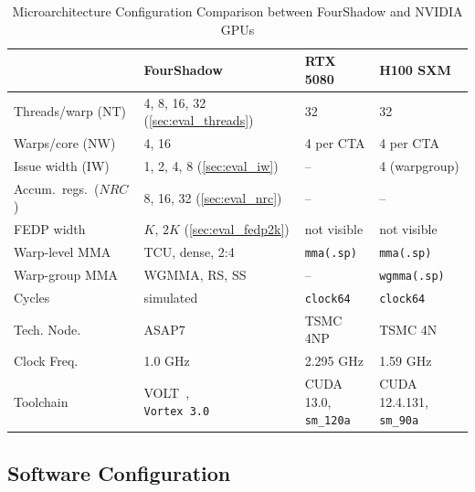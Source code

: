 \begin{table}[h]
\centering
\caption{Microarchitecture Configuration Comparison between FourShadow and NVIDIA GPUs}
\label{tab:config}
\footnotesize
\setlength{\tabcolsep}{2pt}
\renewcommand{\arraystretch}{0.95}
\begin{tabular}{@{}l l l l@{}}
\toprule
 & \textbf{FourShadow} & \textbf{RTX 5080} & \textbf{H100 SXM} \\
\midrule
Threads/warp (NT) & 4, 8, 16, 32 (\ref{sec:eval_threads}) & 32 & 32 \\
Warps/core (NW) & 4, 16 & 4 per CTA & 4 per CTA \\
Issue width (IW) & 1, 2, 4, 8 (\ref{sec:eval_iw}) & -- & 4 (warpgroup) \\
Accum.\ regs.\ ($\mathit{NRC}$) & 8, 16, 32 (\ref{sec:eval_nrc}) & -- & -- \\
FEDP width & $K$, $2K$ (\ref{sec:eval_fedp2k}) & not visible & not visible \\
Warp-level MMA & TCU, dense, 2:4 & \texttt{mma(.sp)} & \texttt{mma(.sp)} \\
Warp-group MMA & WGMMA, RS, SS & -- & \texttt{wgmma(.sp)} \\
\midrule
Cycles & simulated & \texttt{clock64} & \texttt{clock64} \\
Tech. Node. & ASAP7 & TSMC 4NP & TSMC 4N \\
Clock Freq. & 1.0 GHz & 2.295 GHz & 1.59 GHz \\
Toolchain & \makecell[l]{VOLT~\cite{10.1145/3771775.3786275},\\\texttt{Vortex 3.0}} & \makecell[l]{CUDA 13.0,\\\texttt{sm\_120a}} & \makecell[l]{CUDA 12.4.131,\\\texttt{sm\_90a}} \\


\bottomrule
\end{tabular}
\end{table}

\subsection{Software Configuration}\label{sec:method_sw}

